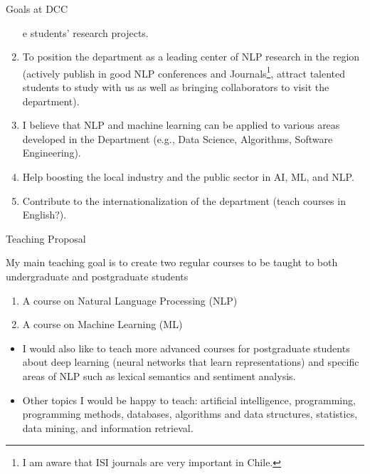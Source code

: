 \documentclass[handout]{beamer}
\begin{document}
\begin{frame}{Goals at DCC}
\begin{scriptsize}
\begin{enumerate}
e students' research projects. 
\item To position the department as a leading  center of NLP research in the region (actively publish in good NLP conferences and Journals\footnote{I am aware that ISI journals are very important in Chile.}, attract talented students to study with us as well as bringing collaborators to visit the department).
\item I believe that NLP and machine learning can be applied to various areas developed in the Department (e.g., Data Science, Algorithms, Software Engineering).
\item Help boosting the local industry and the public sector in AI, ML, and NLP.
\item Contribute to the internationalization of the department (teach courses in English?). 
  \end{enumerate} 
\end{scriptsize}

\end{frame}


\begin{frame}{Teaching Proposal}
\begin{scriptsize}
My main teaching goal is to create two regular courses to be taught to both undergraduate and postgraduate students
\begin{enumerate}
 \item A course on Natural Language Processing (NLP)
 \item A course  on Machine Learning (ML)
  \end{enumerate} 


\begin{itemize}
 \item I would also like to teach more advanced courses for postgraduate students about deep learning (neural networks that learn representations) and specific areas of NLP such as lexical semantics and sentiment analysis.
 \item Other topics I would be happy to teach: artificial intelligence, programming, programming methods, databases, algorithms and data structures, statistics, data mining, and information retrieval.  
\end{itemize}

\end{scriptsize}

\end{frame}
\end{document}
